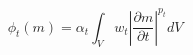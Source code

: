 \begin{equation}
\phi_t(m) = \alpha_t \int_V w_t \left| \frac{\partial m}{\partial t} \right|^{p_t} dV
\label{eq:time-constraint}
\end{equation}
